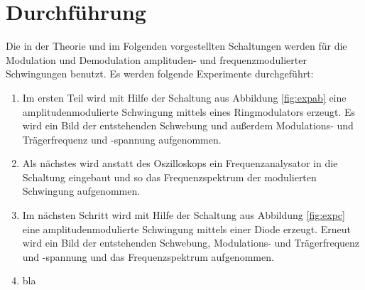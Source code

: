  \section{Durchführung}
\label{sec:Durchführung}

Die in der Theorie und im Folgenden vorgestellten Schaltungen werden für die Modulation und
Demodulation amplituden- und frequenzmodulierter Schwingungen benutzt.
Es werden folgende Experimente durchgeführt:
\begin{enumerate}
  \item Im ersten Teil wird mit Hilfe der Schaltung aus Abbildung \ref{fig:expab} eine
  amplitudenmodulierte Schwingung mittels eines Ringmodulators erzeugt. Es wird ein
  Bild der entstehenden Schwebung und außerdem Modulations- und Trägerfrequenz und -spannung
  aufgenommen.
  \item Als nächstes wird anstatt des Oszilloskops ein Frequenzanalysator in die Schaltung eingebaut
  und so das Frequenzspektrum der modulierten Schwingung aufgenommen.
  \item Im nächsten Schritt wird mit Hilfe der Schaltung aus Abbildung \ref{fig:expc} eine amplitudenmodulierte Schwingung
  mittels einer Diode erzeugt. Erneut wird ein Bild der entstehenden Schwebung, Modulations- und Trägerfrequenz und -spannung und
  das Frequenzspektrum aufgenommen.
  \item bla
\end{enumerate}
